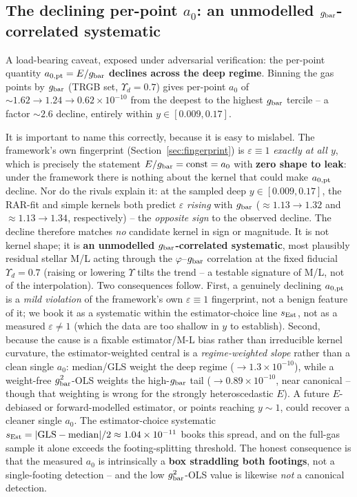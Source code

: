 \documentclass[fleqn,usenatbib]{mnras}
\begin{document}
\subsection{The declining per-point $a_0$: an unmodelled $g_{\rm bar}$-correlated systematic}
\label{sec:decline}

A load-bearing caveat, exposed under adversarial verification: the per-point quantity $a_{0,\rm pt}=E/g_{\rm bar}$ \textbf{declines across the deep regime}. Binning the gas points by $g_{\rm bar}$ (TRGB set, $\Upsilon_d=0.7$) gives per-point $a_0$ of ${\sim}1.62\to1.24\to0.62\times10^{-10}$ from the deepest to the highest $g_{\rm bar}$ tercile -- a factor ${\sim}2.6$ decline, entirely within $y\in[0.009,0.17]$.

It is important to name this correctly, because it is easy to mislabel. The framework's own fingerprint (Section~\ref{sec:fingerprint}) is $\varepsilon\equiv1$ \emph{exactly at all $y$}, which is precisely the statement $E/g_{\rm bar}={\rm const}=a_0$ with \textbf{zero shape to leak}: under the framework there is nothing about the kernel that could make $a_{0,\rm pt}$ decline. Nor do the rivals explain it: at the sampled deep $y\in[0.009,0.17]$, the RAR-fit and simple kernels both predict $\varepsilon$ \emph{rising} with $g_{\rm bar}$ ($\approx1.13\to1.32$ and $\approx1.13\to1.34$, respectively) -- the \emph{opposite sign} to the observed decline. The decline therefore matches \emph{no} candidate kernel in sign or magnitude. It is not kernel shape; it is \textbf{an unmodelled $g_{\rm bar}$-correlated systematic}, most plausibly residual stellar M/L acting through the $\varphi$--$g_{\rm bar}$ correlation at the fixed fiducial $\Upsilon_d=0.7$ (raising or lowering $\Upsilon$ tilts the trend -- a testable signature of M/L, not of the interpolation). Two consequences follow. First, a genuinely declining $a_{0,\rm pt}$ is a \emph{mild violation} of the framework's own $\varepsilon\equiv1$ fingerprint, not a benign feature of it; we book it as a systematic within the estimator-choice line $s_{\rm Est}$, not as a measured $\varepsilon\ne1$ (which the data are too shallow in $y$ to establish). Second, because the cause is a fixable estimator/M-L bias rather than irreducible kernel curvature, the estimator-weighted central is a \emph{regime-weighted slope} rather than a clean single $a_0$: median/GLS weight the deep regime ($\to1.3\times10^{-10}$), while a weight-free $g_{\rm bar}^2$-OLS weights the high-$g_{\rm bar}$ tail ($\to0.89\times10^{-10}$, near canonical -- though that weighting is wrong for the strongly heteroscedastic $E$). A future $E$-debiased or forward-modelled estimator, or points reaching $y\sim1$, could recover a cleaner single $a_0$. The estimator-choice systematic $s_{\rm Est}=|{\rm GLS}-{\rm median}|/2\approx1.04\times10^{-11}$ books this spread, and on the full-gas sample it alone exceeds the footing-splitting threshold. The honest consequence is that the measured $a_0$ is intrinsically a \textbf{box straddling both footings}, not a single-footing detection -- and the low $g_{\rm bar}^2$-OLS value is likewise \emph{not} a canonical detection.
\end{document}
